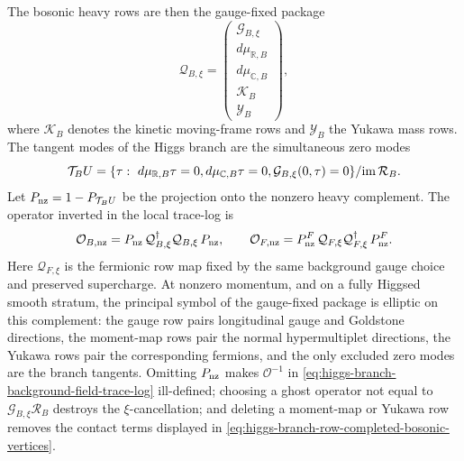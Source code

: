 \begin{example}
The bosonic heavy rows are then the gauge-fixed package
\begin{equation}
  {\mathcal Q}_{B,\xi}
  =
  \begin{pmatrix}
    {\mathcal G}_{B,\xi}\\
    d\mu_{\mathbb R,B}\\
    d\mu_{\mathbb C,B}\\
    {\mathcal K}_{B}\\
    {\mathcal Y}_{B}
  \end{pmatrix},
  \label{eq:higgs-branch-gauge-fixed-heavy-package}
\end{equation}
where \({\mathcal K}_B\) denotes the kinetic moving-frame rows and
\({\mathcal Y}_B\) the Yukawa mass rows.  The tangent modes of the Higgs branch
are the simultaneous zero modes
\begin{equation}
  {\mathcal T}_B U
  =
  \{\tau:\ d\mu_{\mathbb R,B}\tau=0,
          d\mu_{\mathbb C,B}\tau=0,
          {\mathcal G}_{B,\xi}(0,\tau)=0\}/{\rm im}\,{\mathcal R}_B .
  \label{eq:higgs-branch-tangent-zero-mode-space}
\end{equation}
Let \(P_{\rm nz}=1-P_{{\mathcal T}_B U}\) be the projection onto the nonzero
heavy complement.  The operator inverted in the local trace-log is
\begin{equation}
  {\mathcal O}_{B,{\rm nz}}
  =
  P_{\rm nz}\,
  {\mathcal Q}_{B,\xi}^\dagger{\mathcal Q}_{B,\xi}\,
  P_{\rm nz},
  \qquad
  {\mathcal O}_{F,{\rm nz}}
  =
  P_{\rm nz}^{F}\,
  {\mathcal Q}_{F,\xi}{\mathcal Q}_{F,\xi}^\dagger\,
  P_{\rm nz}^{F}.
  \label{eq:higgs-branch-projected-heavy-operators}
\end{equation}
Here \({\mathcal Q}_{F,\xi}\) is the fermionic row map fixed by the same
background gauge choice and preserved supercharge.
At nonzero momentum, and on a fully Higgsed smooth stratum, the principal symbol
of the gauge-fixed package is elliptic on this complement: the gauge row pairs
longitudinal gauge and Goldstone directions, the moment-map rows pair the normal
hypermultiplet directions, the Yukawa rows pair the corresponding fermions, and
the only excluded zero modes are the branch tangents.  Omitting \(P_{\rm nz}\)
makes \({\mathcal O}^{-1}\) in
\eqref{eq:higgs-branch-background-field-trace-log} ill-defined; choosing a ghost
operator not equal to \({\mathcal G}_{B,\xi}{\mathcal R}_B\) destroys the
\(\xi\)-cancellation; and deleting a moment-map or Yukawa row removes the contact
terms displayed in
\eqref{eq:higgs-branch-row-completed-bosonic-vertices}.
\end{example}

